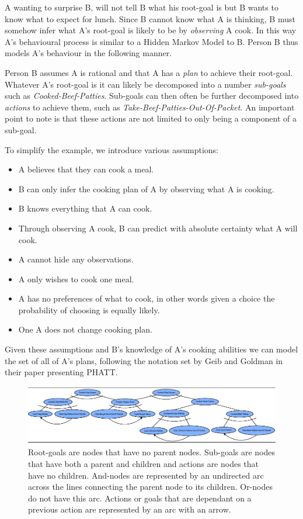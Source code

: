 \documentclass[parskip]{cs4rep}
\begin{document}
A wanting to surprise B, will not tell B what his root-goal is but B wants to know what to expect for lunch. Since B cannot know what A is thinking, B must somehow infer what A's root-goal is likely to be by \textit{observing} A cook. In this way A's behavioural process is similar to a Hidden Markov Model to B. Person B thus models A's behaviour in the following manner. 

Person B assumes A is rational and that A has a \textit{plan} to achieve their root-goal. Whatever A's root-goal is it can likely be decomposed into a number \textit{sub-goals} such as \textit{Cooked-Beef-Patties}. Sub-goals can then often be further decomposed into \textit{actions} to achieve them, such as \textit{Take-Beef-Patties-Out-Of-Packet}. An important point to note is that these actions are not limited to only being a component of a sub-goal.

To simplify the example, we introduce various assumptions:

\begin{itemize}
\item
A believes that they can cook a meal.
\item
B can only infer the cooking plan of A by observing what A is cooking.
\item
B knows everything that A can cook.
\item
Through observing A cook, B can predict with absolute certainty what A will cook.
\item
A cannot hide any observations.
\item
A only wishes to cook one meal.
\item
A has no preferences of what to cook, in other words given a choice the probability of choosing is equally likely.
\item
One A does not change cooking plan.
\end{itemize}

Given these assumptions and B's knowledge of A's cooking abilities we can model the set of all of A's plans, following the notation set by Geib and Goldman in their paper presenting PHATT.

\begin{figure}[h]
\centerline{
	\includegraphics{images/example-plan-library.pdf}
}
\caption{Root-goals are nodes that have no parent nodes. Sub-goals are nodes that have both a parent and children and actions are nodes that have no children. And-nodes are represented by an undirected arc across the lines connecting the parent node to its children. Or-nodes do not have this arc. Actions or goals that are dependant on a previous action are represented by an arc with an arrow.}
\label{fig:example-plan-library}
\end{figure}
\end{document}
